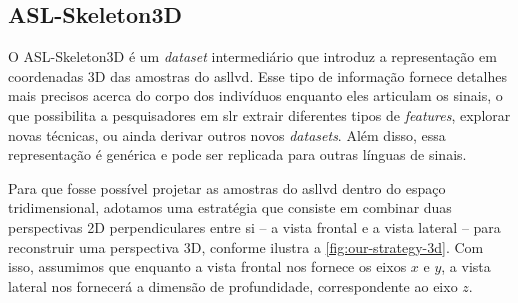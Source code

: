 \subsection{ASL-Skeleton3D}
\label{sec:metodos-datasets-3d}


O ASL-Skeleton3D é um \textit{dataset} intermediário que introduz a representação em coordenadas 3D das amostras do \acrshort{asllvd}. 
Esse tipo de informação fornece detalhes mais precisos acerca do corpo dos indivíduos enquanto eles articulam os sinais, o que possibilita a pesquisadores em \acrshort{slr} extrair diferentes tipos de \textit{features}, explorar novas técnicas, ou ainda derivar outros novos \textit{datasets}.
Além disso, essa representação é genérica e pode ser replicada para outras línguas de sinais.

Para que fosse possível projetar as amostras do \acrshort{asllvd} dentro do espaço tridimensional, adotamos uma estratégia que consiste em combinar duas perspectivas 2D perpendiculares entre si -- a vista frontal e a vista lateral -- para reconstruir uma perspectiva 3D, conforme ilustra a \autoref{fig:our-strategy-3d}. Com isso, assumimos que enquanto a vista frontal nos fornece os eixos \(x\) e \(y\), a vista lateral nos fornecerá a dimensão de profundidade, correspondente ao eixo \( z\).


